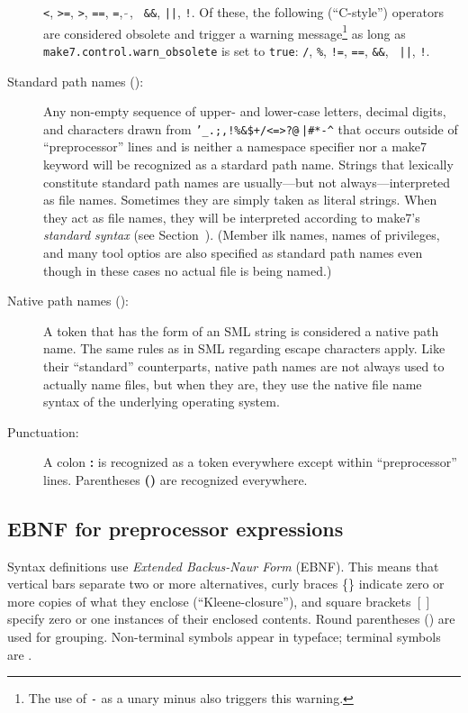 \begin{description}
{\tt <}, {\tt >=}, {\tt >}, {\tt ==}, {\tt =}, $\tilde{~}$, {\tt
\&\&}, {\tt ||}, {\tt !}.  Of these, the following (``C-style'')
operators are considered obsolete and trigger a warning
message\footnote{The use of {\tt -} as a unary minus also triggers
this warning.} as long as {\tt make7.control.warn\_obsolete} is set to
{\tt true}: {\tt /}, {\tt \%}, {\tt !=}, {\tt ==}, {\tt \&\&}, {\tt
||}, {\tt !}.
\item[Standard path names (\nt{stdpn}):] Any non-empty sequence of
upper- and lower-case letters, decimal digits, and characters drawn
from {\tt '\_.;,!\%\&\$+/<=>?@$\tilde{~}$|\#*-\verb|^|} that occurs
outside of ``preprocessor'' lines and is neither a namespace specifier
nor a make7 keyword will be recognized as a stardard path name.  Strings
that lexically constitute standard path names are usually---but not
always---interpreted as file names. Sometimes they are simply taken as
literal strings.  When they act as file names, they will be
interpreted according to make7's {\em standard syntax} (see
Section~).  (Member ilk names, names of
privileges, and many tool optios are also specified as standard path
names even though in these cases no actual file is being named.)
\item[Native path names (\nt{ntvpn}):] A token that has the form of an
SML string is considered a native path name.  The same rules as in SML
regarding escape characters apply.  Like their ``standard''
counterparts, native path names are not always used to actually name
files, but when they are, they use the native file name syntax of the
underlying operating system.
\item[Punctuation:] A colon {\bf :} is recognized as a token
everywhere except within ``preprocessor'' lines. Parentheses {\bf ()}
are recognized everywhere.
\end{description}

\subsection{EBNF for preprocessor expressions}

\/ Syntax definitions use {\em
Extended Backus-Naur Form} (EBNF).  This means that vertical bars
\vb separate two or more alternatives, curly braces \{\} indicate
zero or more copies of what they enclose (``Kleene-closure''), and
square brackets $[]$ specify zero or one instances of their enclosed
contents.  Round parentheses () are used for grouping.  Non-terminal
symbols appear in \/ typeface; terminal symbols are
.

